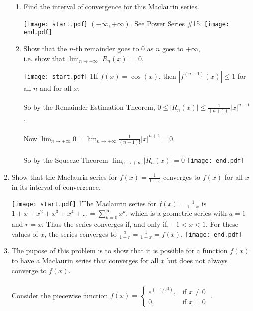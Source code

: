 \documentclass[12pt]{article}
\begin{document}
\begin{enumerate}
\begin{enumerate}
\item Find the interval of convergence for this Maclaurin series.

\texttt{[image: start.pdf]}
{{$(-\infty, +\infty)$.  See \underline{Power Series} \#15.}}
\texttt{[image: end.pdf]}


\item Show that the $n$-th remainder goes to $0$ as $n$ goes to $+\infty$, \\ i.e. show that $\lim_{n \to +\infty}{|R_n(x)|=0}$.

\texttt{[image: start.pdf]}
{{{1\linewidth}{If $f(x)=\cos(x)$, then $|f^{(n+1)}(x)| \leq 1$ for all $n$ and for all $x$. 
\\ \\ So by the Remainder Estimation Theorem, $\textstyle 0 \leq |R_n(x)| \leq \frac{1}{(n+1)!} |x|^{n+1}$.
\\ \\ Now $\lim_{n \to +\infty}{0} = \lim_{n \to +\infty}{ \frac{1}{(n+1)!} |x|^{n+1}} = 0$.
\\ \\ So by the Squeeze Theorem $\lim_{n \to +\infty}{|R_n(x)|=0}$      }}}
\texttt{[image: end.pdf]}


\end{enumerate}

\item Show that the Maclaurin series for $\textstyle f(x)=\frac{1}{1-x}$ converges to $f(x)$ for all $x$ in its interval of convergence.

\texttt{[image: start.pdf]}
{{{1\linewidth}{The Maclaurin series for $\textstyle f(x)=\frac{1}{1-x}$ is $\textstyle 1+x+x^2+x^3+x^4+\ldots = \sum_{k=0}^{\infty}{x^k}$, which is a geometric series with
$a=1$ and $r=x$.  Thus the series converges if, and only if, $-1 < x < 1$.  For these values of $x$, the series converges to $\textstyle \frac{a}{1-r}=\frac{1}{1-x}=f(x)$. }}}
\texttt{[image: end.pdf]}


\item The pupose of this problem is to show that it is possible for a function $f(x)$ to have a Maclaurin series that converges for all $x$ but does not always converge to $f(x)$.
\\ \\ Consider the piecewise function $f(x) = \begin{cases} 
e^{(-1/x^2)}, & \text{if } x \neq 0 \\
0, & \text{if } x = 0 \end{cases}$ .


\end{enumerate}
\end{document}
